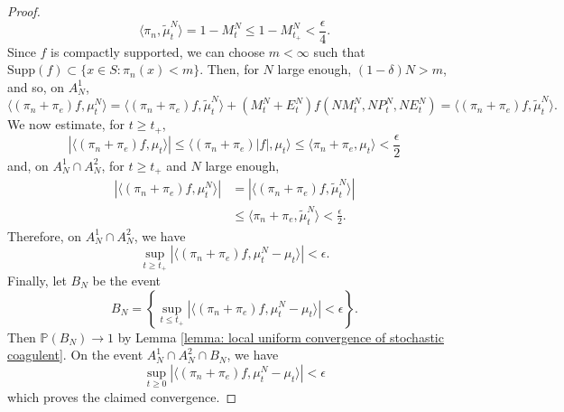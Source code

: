 \begin{proof}
\begin{equation}
    \langle \pi_n, \widetilde{\mu}^N_t\rangle =1-M^N_t \leq 1-M^N_{t_+} <\frac{\epsilon}{4}.
\end{equation} Since $f$ is compactly supported, we can choose $m<\infty$ such that $\text{Supp}(f)\subset \{x\in S: \pi_n(x)<m\}$. Then, for $N$ large enough, $(1-\delta)N>m$, and so, on $A^1_N$, \begin{equation}
    \langle (\pi_n+\pi_e)f,\mu^N_t\rangle = \langle (\pi_n+\pi_e)f,\widetilde{\mu}^N_t\rangle+(M^N_t+E^N_t)f(NM^N_t,NP^N_t, NE^N_t) =  \langle (\pi_n+\pi_e)f,\widetilde{\mu}^N_t\rangle.
\end{equation} We now estimate, for $t\geq t_+$, \begin{equation}
    |\langle (\pi_n+\pi_e)f, \mu_t\rangle|\leq \langle (\pi_n+\pi_e)|f|, \mu_t\rangle \leq \langle \pi_n+\pi_e, \mu_t\rangle <\frac{\epsilon}{2}
\end{equation} and, on $A^1_N\cap A^2_N$, for $t\geq t_+$  and $N$ large enough, \begin{equation} \begin{split}
    |\langle (\pi_n+\pi_e)f, \mu^N_t\rangle|&=|\langle (\pi_n+\pi_e)f, \widetilde{\mu}^N_t\rangle | \\ & \leq \langle \pi_n+\pi_e, \widetilde{\mu}^N_t\rangle <\frac{\epsilon}{2}.   \end{split}
\end{equation} Therefore, on $A^1_N\cap A^2_N$, we have \begin{equation}
    \sup_{t\geq t_+}|\langle (\pi_n+\pi_e)f, \mu^N_t-\mu_t\rangle| <\epsilon.
\end{equation} Finally, let $B_N$ be the event \begin{equation}
    B_N=\left\{\sup_{t\leq t_+} |\langle (\pi_n+\pi_e)f, \mu^N_t-\mu_t\rangle |<\epsilon\right\}.
\end{equation} Then $\mathbb{P}(B_N)\rightarrow 1$ by Lemma \ref{lemma: local uniform convergence of stochastic coagulent}. On the event $A^1_N\cap A^2_N\cap B_N$, we have \begin{equation}
    \sup_{t\geq 0} |\langle (\pi_n+\pi_e)f, \mu^N_t-\mu_t\rangle |<\epsilon
\end{equation} which proves the claimed convergence.
\end{proof}